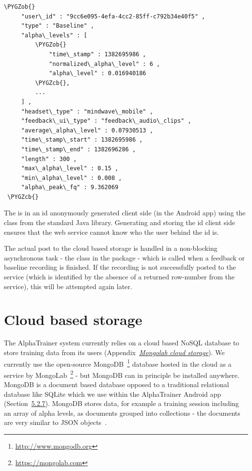 \documentclass[a4paper,10pt,english,lof,lot,twoside]{puthesis}
\def\PYGZob{\char`\{}
\def\PYGZcb{\char`\}}
\begin{document}
\begin{Verbatim}[commandchars=\\\{\}]
 \PYGZob{}
     "user\_id" : "9cc6e095-4efa-4cc2-85ff-c792b34e40f5" ,
     "type" : "Baseline" ,
     "alpha\_levels" : [
         \PYGZob{}
             "time\_stamp" : 1382695986 ,
             "normalized\_alpha\_level" : 6 ,
             "alpha\_level" : 0.016940186
         \PYGZcb{},
         ...
     ] ,
     "headset\_type" : "mindwave\_mobile" ,
     "feedback\_ui\_type" : "feedback\_audio\_clips" ,
     "average\_alpha\_level" : 0.07930513 ,
     "time\_stamp\_start" : 1382695986 ,
     "time\_stamp\_end" : 1382696286 ,
     "length" : 300 ,
     "max\_alpha\_level" : 0.15 ,
     "min\_alpha\_level" : 0.008 ,
     "alpha\_peak\_fq" : 9.362069
 \PYGZcb{}
\end{Verbatim}

The  is in an id anonymously generated client side (in the Android app)
using the  class from the standard Java library. Generating and storing the id
client side ensures that the web service cannot know who the user behind the id is.

The actual post to the cloud based storage is handled in a non-blocking asynchronous
task - the  class in the 
package - which is called when a feedback or baseline recording is finished. If the
recording is not successfully posted to the service (which is identified by the absence
of a returned row-number from the service), this will be attempted again later.


\section{Cloud based storage}
\label{ch-implementation/index:ch-implementation-alphatrainer-cloud-based-storage}\label{ch-implementation/index:cloud-based-storage}
The AlphaTrainer system currently relies on a cloud based NoSQL database to
store training data from its users (Appendix {\hyperref[appendix_software:appendix-alphatrainer-mongolab-cloud-storage]{\emph{Mongolab cloud storage}}}). We currently use the
open-source MongoDB \footnote{
\href{http://www.mongodb.org}{http://www.mongodb.org}
} database hosted in the cloud
as a service by MongoLab \footnote{
\href{https://mongolab.com}{https://mongolab.com}
} - but MongoDB can in
principle be installed anywhere. MongoDB is a document based database opposed
to a traditional relational database like SQLite which we use within the
AlphaTrainer Android app (Section {\hyperref[ch-implementation/index:ch-implementation-models-persistent-storage]{5.2.7}}). MongoDB stores data, for
example a training session including an array of alpha levels, as documents
grouped into collections - the
documents are very similar to JSON objects \cite{nayak_instant_2013}.
\end{document}
